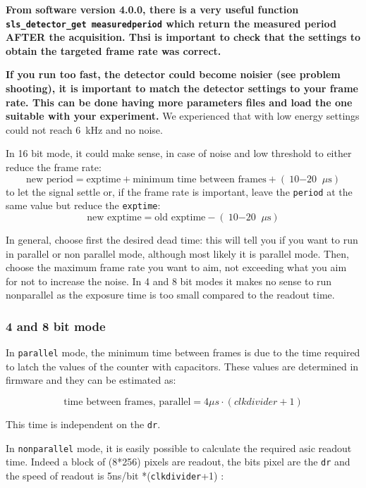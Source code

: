 \documentclass{article}
\begin{document}
\textbf{From software version 4.0.0, there is a very useful function {\tt{sls\_detector\_get measuredperiod}} which return the measured period AFTER the acquisition. Thsi is important to check that the settings to obtain the targeted frame rate was correct.} 

\textbf{If you run too fast, the detector could become noisier (see problem shooting), it is important to match the detector settings to your frame rate. This can be done having more parameters files and load the one suitable with your experiment.} We experienced that with low energy settings could not reach 6~kHz and no noise.

In 16 bit mode, it could make sense, in case of noise and low threshold to either reduce the frame rate:
\begin{equation} 
\textrm{new period}  = \textrm{exptime} + \textrm{minimum time between frames} + (\textrm{10$-$20 }\mu \textrm{s})
\end{equation}
to let the signal settle  or,  if the frame rate is important, leave the {\tt{period}} at the same value but reduce the {\tt{exptime}}:
\begin{equation} 
\textrm{new exptime}  = \textrm{old exptime} - (\textrm{10$-$20 }\mu \textrm{s})
\end{equation}

In general, choose first the desired dead time: this will tell you if you want to run in parallel or non parallel mode, although most likely it is parallel mode. Then, choose the maximum frame rate you want to aim, not exceeding what you aim for not to increase the noise. In 4 and 8 bit modes it makes no sense to run nonparallel as the exposure time is too small compared to the readout time. 

\subsubsection{4 and 8 bit mode}
In {\tt{parallel}} mode, the minimum time between frames is due to the time required to latch the values of the counter with capacitors. These values are determined in firmware and they can be estimated as:

\begin{equation} \label{dtparallel}
\textrm{time between frames, parallel} = 4 \mu s \cdot (clkdivider+1)
\end{equation}

This time is independent on the {\tt{dr}}.

In {\tt{nonparallel}} mode, it is easily possible to calculate the required asic readout time. 
Indeed a block of (8*256) pixels are readout, the bits pixel are the {\tt{dr}} and the speed of readout is 5ns/bit *({\tt{clkdivider}}+1) : 
\end{document}
